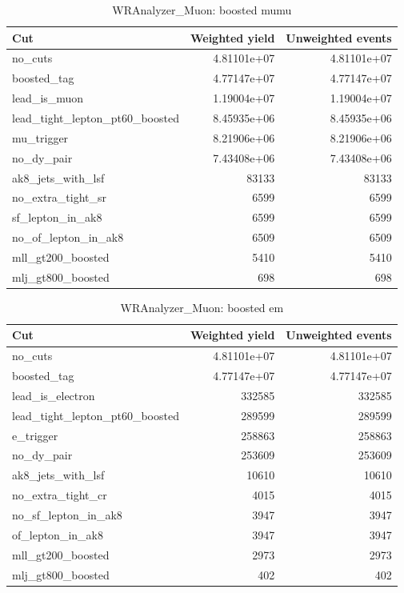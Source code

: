 \documentclass{article}
\begin{document}
\begin{table}[htbp]
\centering
\caption{WRAnalyzer\_Muon: boosted mumu}
\begin{tabular}{lrr}
\hline
Cut & Weighted yield & Unweighted events \\
\hline
no\_cuts & 4.81101e+07 & 4.81101e+07 \\
boosted\_tag & 4.77147e+07 & 4.77147e+07 \\
lead\_is\_muon & 1.19004e+07 & 1.19004e+07 \\
lead\_tight\_lepton\_pt60\_boosted & 8.45935e+06 & 8.45935e+06 \\
mu\_trigger & 8.21906e+06 & 8.21906e+06 \\
no\_dy\_pair & 7.43408e+06 & 7.43408e+06 \\
ak8\_jets\_with\_lsf & 83133 & 83133 \\
no\_extra\_tight\_sr & 6599 & 6599 \\
sf\_lepton\_in\_ak8 & 6599 & 6599 \\
no\_of\_lepton\_in\_ak8 & 6509 & 6509 \\
mll\_gt200\_boosted & 5410 & 5410 \\
mlj\_gt800\_boosted & 698 & 698 \\
\hline
\end{tabular}
\end{table}

\begin{table}[htbp]
\centering
\caption{WRAnalyzer\_Muon: boosted em}
\begin{tabular}{lrr}
\hline
Cut & Weighted yield & Unweighted events \\
\hline
no\_cuts & 4.81101e+07 & 4.81101e+07 \\
boosted\_tag & 4.77147e+07 & 4.77147e+07 \\
lead\_is\_electron & 332585 & 332585 \\
lead\_tight\_lepton\_pt60\_boosted & 289599 & 289599 \\
e\_trigger & 258863 & 258863 \\
no\_dy\_pair & 253609 & 253609 \\
ak8\_jets\_with\_lsf & 10610 & 10610 \\
no\_extra\_tight\_cr & 4015 & 4015 \\
no\_sf\_lepton\_in\_ak8 & 3947 & 3947 \\
of\_lepton\_in\_ak8 & 3947 & 3947 \\
mll\_gt200\_boosted & 2973 & 2973 \\
mlj\_gt800\_boosted & 402 & 402 \\
\hline
\end{tabular}
\end{table}
\end{document}

